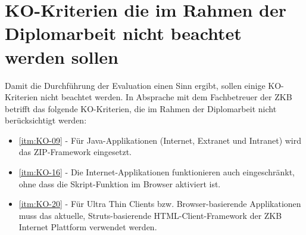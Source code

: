   \section{KO-Kriterien die im Rahmen der Diplomarbeit nicht beachtet werden
  sollen}\label{section:KoKriterienDieNichtBeachtetWerden}
  
  Damit die Durchführung der Evaluation einen Sinn ergibt, sollen einige
  KO-Kriterien nicht beachtet werden. In Absprache mit dem Fachbetreuer der
  \ac{ZKB} betrifft das folgende KO-Kriterien, die im Rahmen der Diplomarbeit
  nicht berücksichtigt werden:
  
  \begin{itemize}
    \item \ref{itm:KO-09} - Für Java-Applikationen (Internet, Extranet und
    Intranet) wird das ZIP-Framework eingesetzt.
    \item \ref{itm:KO-16} - Die Internet-Applikationen funktionieren auch
    eingeschränkt, ohne dass die Skript-Funktion im Browser aktiviert ist.
    \item \ref{itm:KO-20} - Für Ultra Thin Clients bzw. Browser-basierende
    Applikationen muss das aktuelle, Struts-basierende HTML-Client-Framework
    der ZKB Internet Plattform verwendet werden.
  \end{itemize}
